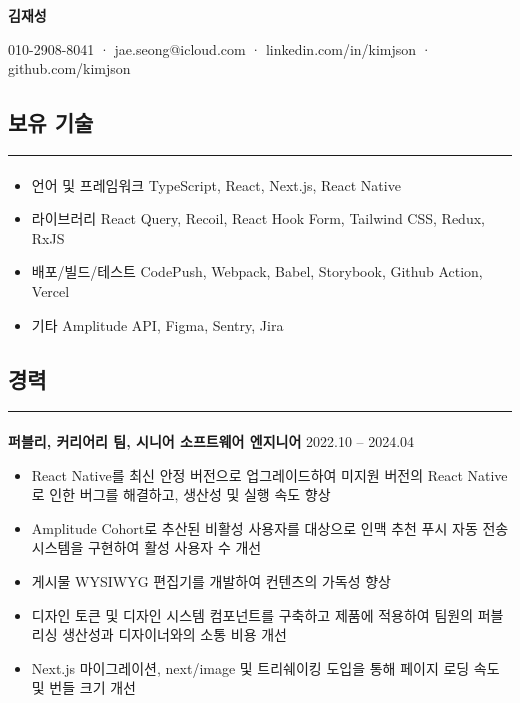 \documentclass{article}
\begin{document}
\begin{center}
    \huge\textbf{김재성}
\end{center}

\begin{center}
    010-2908-8041 · jae.seong@icloud.com · linkedin.com/in/kimjson · github.com/kimjson
\end{center}

\begin{center}
    \section*{보유 기술}
\end{center}
\hrule
\paragraph{}
\begin{itemize}
    \setlength\itemsep{0.1em}
    \item 언어 및 프레임워크 \hspace{1em} TypeScript, React, Next.js, React Native
    \item 라이브러리 \hspace{4.1em} React Query, Recoil, React Hook Form, Tailwind CSS, Redux, RxJS
    \item 배포/빌드/테스트 \hspace{1.3em} CodePush, Webpack, Babel, Storybook, Github Action, Vercel
    \item 기타 \hspace{6.7em} Amplitude API, Figma, Sentry, Jira
\end{itemize}

\begin{center}
    \section*{경력}
\end{center}
\hrule
\paragraph{\newline \newline}
\textbf{퍼블리, 커리어리 팀, 시니어 소프트웨어 엔지니어} \hfill 2022.10 -- 2024.04
\begin{itemize}
    \setlength\itemsep{0.1em}
    \item React Native를 최신 안정 버전으로 업그레이드하여 미지원 버전의 React Native로 인한 버그를 해결하고, 생산성 및 실행 속도 향상
    \item Amplitude Cohort로 추산된 비활성 사용자를 대상으로 인맥 추천 푸시 자동 전송 시스템을 구현하여 활성 사용자 수 개선
    \item 게시물 WYSIWYG 편집기를 개발하여 컨텐츠의 가독성 향상
    \item 디자인 토큰 및 디자인 시스템 컴포넌트를 구축하고 제품에 적용하여 팀원의 퍼블리싱 생산성과 디자이너와의 소통 비용 개선
    \item Next.js 마이그레이션, next/image 및 트리쉐이킹 도입을 통해 페이지 로딩 속도 및 번들 크기 개선
\end{itemize}
\end{document}
